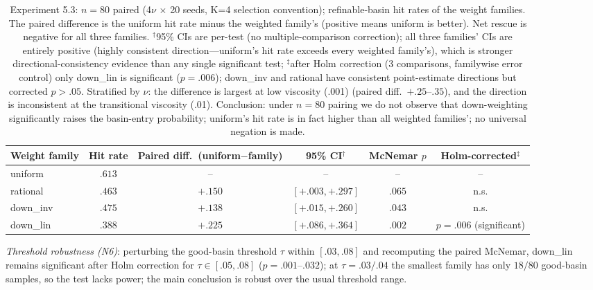 \documentclass[11pt]{article}
\numberwithin{equation}{section}
\begin{document}
\begin{table}[ht]\centering\small\renewcommand{\arraystretch}{1.2}\setlength{\tabcolsep}{3.5pt}
\begin{tabular}{lccccc}
\toprule
Weight family & Hit rate & Paired diff.\ (uniform$-$family) & 95\% CI$^\dagger$ & McNemar $p$ & Holm-corrected$^\ddagger$\\
\midrule
uniform & $.613$ & -- & -- & -- & --\\
rational & $.463$ & $+.150$ & $[+.003,+.297]$ & $.065$ & n.s.\\
down\_inv & $.475$ & $+.138$ & $[+.015,+.260]$ & $.043$ & n.s.\\
down\_lin & $.388$ & $+.225$ & $[+.086,+.364]$ & $.002$ & $p=.006$ (significant)\\
\bottomrule
\end{tabular}
\caption{Experiment 5.3: $n=80$ paired (4$\nu$ $\times$ 20 seeds, K=4 selection convention); refinable-basin hit rates of the weight families. The paired difference is the uniform hit rate minus the weighted family's (positive means uniform is better). Net rescue is negative for all three families. $^\dagger$95\% CIs are per-test (no multiple-comparison correction); all three families' CIs are entirely positive (highly consistent direction---uniform's hit rate exceeds every weighted family's), which is stronger directional-consistency evidence than any single significant test; $^\ddagger$after Holm correction (3 comparisons, familywise error control) only down\_lin is significant ($p=.006$); down\_inv and rational have consistent point-estimate directions but corrected $p>.05$. Stratified by $\nu$: the difference is largest at low viscosity (.001) (paired diff.\ $+.25$--$.35$), and the direction is inconsistent at the transitional viscosity (.01). Conclusion: under $n=80$ pairing we do not observe that down-weighting significantly raises the basin-entry probability; uniform's hit rate is in fact higher than all weighted families'; no universal negation is made.}\label{tab:g1b}
\end{table}

\noindent\emph{Threshold robustness (N6)}: perturbing the good-basin threshold $\tau$ within $[.03,.08]$ and recomputing the paired McNemar, down\_lin remains significant after Holm correction for $\tau\in[.05,.08]$ ($p=.001$--$.032$); at $\tau=.03/.04$ the smallest family has only $18/80$ good-basin samples, so the test lacks power; the main conclusion is robust over the usual threshold range.
\end{document}
